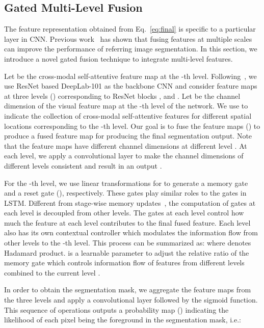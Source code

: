 \subsection{Gated Multi-Level Fusion}\label{sec:gf}
The feature representation  obtained from Eq.~\ref{eq:final} is specific to a particular layer in CNN. Previous work~\cite{li2018referring} has shown that fusing features at multiple scales can improve the performance of referring image segmentation. In this section, we introduce a novel gated fusion technique to integrate multi-level features.

Let  be the cross-modal self-attentive feature map at the -th level. Following~\cite{li2018referring}, we use ResNet based DeepLab-101 as the backbone CNN and consider feature maps at three levels () corresponding to ResNet blocks ,  and . Let  be the channel dimension of the visual feature map at the -th level of the network. We use  to indicate the collection of cross-modal self-attentive features  for different spatial locations corresponding to the -th level. Our goal is to fuse the feature maps  () to produce a fused feature map for producing the final segmentation output.
Note that the feature maps   have different channel dimensions at different level . At each level, we apply a  convolutional layer to make the channel dimensions of different levels consistent and result in an output .



For the -th level, we use linear transformations for  to generate a memory gate  and a reset gate  (), respectively. These gates play similar roles to the gates in LSTM. Different from stage-wise memory updates~\cite{cho2014learning,hochreiter1997long}, the computation of gates at each level is decoupled from other levels. The gates at each level control how much the feature at each level contributes to the final fused feature. Each level also has its own contextual controller  which modulates the information flow from other levels to the -th level. This process can be summarized as: 
where  denotes Hadamard product.  is a learnable parameter to adjust the relative ratio of the memory gate which controls information flow of features from different levels  combined to the current level . 

In order to obtain the segmentation mask, we aggregate the feature maps  from the three levels and apply a  convolutional layer followed by the sigmoid function. This sequence of operations outputs a probability map () indicating the likelihood of each pixel being the foreground in the segmentation mask, i.e.:

